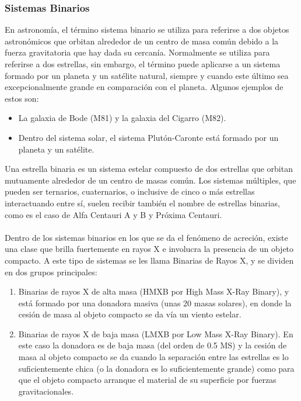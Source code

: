 \subsubsection{Sistemas Binarios}
En astronomía, el término sistema binario se utiliza para referirse a dos objetos astronómicos que orbitan alrededor de un centro de masa común debido a la fuerza gravitatoria que hay dada su cercanía. Normalmente se utiliza para referirse a dos estrellas, sin embargo, el término puede aplicarse a un sistema formado por un planeta y un satélite natural, siempre y cuando este último sea excepcionalmente grande en comparación con el planeta. Algunos ejemplos de estos son:
\begin{itemize}
    \item La galaxia de Bode (M81) y la galaxia del Cigarro (M82).
    \item Dentro del sistema solar, el sistema Plutón-Caronte está formado por un planeta y un satélite.
\end{itemize}
Una estrella binaria es un sistema estelar compuesto de dos estrellas que orbitan mutuamente alrededor de un centro de masas común\cite{CanazasGaray2015}. Los sistemas múltiples, que pueden ser ternarios, cuaternarios, o inclusive de cinco o más estrellas interactuando entre sí, suelen recibir también el nombre de estrellas binarias, como es el caso de Alfa Centauri A y B y Próxima Centauri.\\\\
Dentro de los sistemas binarios en los que se da el fenómeno de acreción, existe una clase que brilla fuertemente en rayos X e involucra la presencia de un objeto compacto. A este tipo de sistemas se les llama Binarias de Rayos X, y se dividen en dos grupos principales:
\begin{enumerate}
    \item Binarias de rayos X de alta masa (HMXB por High Mass X-Ray Binary)\cite{10.1111/j.1365-2966.2011.19862.x}, y está formado por una donadora masiva (unas 20 masas solares), en donde la cesión de masa al objeto compacto se da vía un viento estelar.
    \item Binarias de rayos X de baja masa (LMXB por Low Mass X-Ray Binary)\cite{1984ApJS...54..443P}. En este caso la donadora es de baja masa (del orden de 0.5 MS) y la cesión de masa al objeto compacto se da cuando la separación entre las estrellas es lo suficientemente chica (o la donadora es lo suficientemente grande) como para que el objeto compacto arranque el material de su superficie por fuerzas gravitacionales.
 \end{enumerate}
